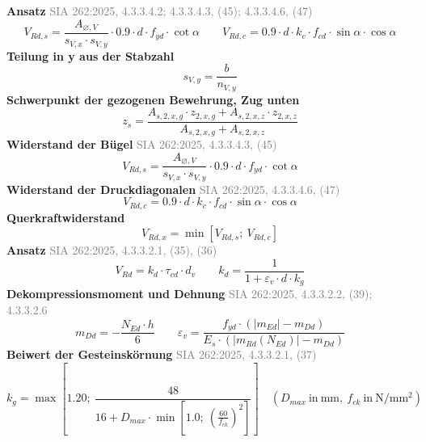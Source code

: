 \documentclass[11pt,a4paper]{article}
\newcommand{\normref}[1]{{\small\textcolor{gray}{#1}}}
\begin{document}
\noindent\textbf{Ansatz} \hfill \normref{SIA 262:2025, 4.3.3.4.2; 4.3.3.4.3, (45); 4.3.3.4.6, (47)}
\begin{equation*}
V_{Rd,s} = \frac{A_{\varnothing,V}}{s_{V,x} \cdot s_{V,y}} \cdot 0.9 \cdot d \cdot f_{yd} \cdot \cot\alpha \qquad V_{Rd,c} = 0.9 \cdot d \cdot k_c \cdot f_{cd} \cdot \sin\alpha \cdot \cos\alpha
\end{equation*}
\noindent\textbf{Teilung in y aus der Stabzahl}
\begin{equation*}
s_{V,y} = \frac{b}{n_{V,y}}
\end{equation*}
\noindent\textbf{Schwerpunkt der gezogenen Bewehrung, Zug unten}
\begin{equation*}
z_s = \frac{A_{s,2,x,g} \cdot z_{2,x,g} + A_{s,2,x,z} \cdot z_{2,x,z}}{A_{s,2,x,g} + A_{s,2,x,z}}
\end{equation*}
\noindent\textbf{Widerstand der Bügel} \hfill \normref{SIA 262:2025, 4.3.3.4.3, (45)}
\begin{equation*}
V_{Rd,s} = \frac{A_{\varnothing,V}}{s_{V,x} \cdot s_{V,y}} \cdot 0.9 \cdot d \cdot f_{yd} \cdot \cot \alpha
\end{equation*}
\noindent\textbf{Widerstand der Druckdiagonalen} \hfill \normref{SIA 262:2025, 4.3.3.4.6, (47)}
\begin{equation*}
V_{Rd,c} = 0.9 \cdot d \cdot k_c \cdot f_{cd} \cdot \sin \alpha \cdot \cos \alpha
\end{equation*}
\noindent\textbf{Querkraftwiderstand}
\begin{equation*}
V_{Rd,x} = \min\left[V_{Rd,s};\ V_{Rd,c}\right]
\end{equation*}
\noindent\textbf{Ansatz} \hfill \normref{SIA 262:2025, 4.3.3.2.1, (35), (36)}
\begin{equation*}
V_{Rd} = k_d \cdot \tau_{cd} \cdot d_v \qquad k_d = \frac{1}{1 + \varepsilon_v \cdot d \cdot k_g}
\end{equation*}
\noindent\textbf{Dekompressionsmoment und Dehnung} \hfill \normref{SIA 262:2025, 4.3.3.2.2, (39); 4.3.3.2.6}
\begin{equation*}
m_{Dd} = -\frac{N_{Ed} \cdot h}{6} \qquad \varepsilon_v = \frac{f_{yd} \cdot \left(\left|m_{Ed}\right| - m_{Dd}\right)}{E_s \cdot \left(\left|m_{Rd}(N_{Ed})\right| - m_{Dd}\right)}
\end{equation*}
\noindent\textbf{Beiwert der Gesteinskörnung} \hfill \normref{SIA 262:2025, 4.3.3.2.1, (37)}
\begin{equation*}
k_g = \max\left[1.20;\ \frac{48}{16 + D_{max} \cdot \min\left[1.0;\ \left(\frac{60}{f_{ck}}\right)^{2}\right]}\right] \quad \left(D_{max}\ \text{in}\ \mathrm{mm},\ f_{ck}\ \text{in}\ \mathrm{N}/\mathrm{mm}^{2}\right)
\end{equation*}
\end{document}
